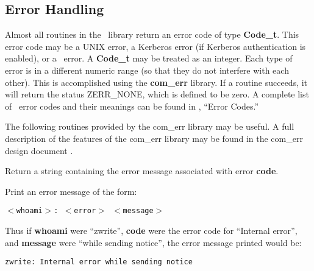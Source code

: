 %
\subsection{Error Handling}
\label{error-handling}

Almost all routines in the \Zephyr\ library return an error
code of type {\bf Code_t}.  This error code may be a UNIX
error, a Kerberos error (if Kerberos authentication is enabled), or a
\Zephyr\ error.  A {\bf Code_t} may be treated as an integer.  Each
type of error is in a different numeric range (so that
they do not interfere with each other).  This is accomplished using the
{\bf com_err} library.  If a routine succeeds, it will return the
status ZERR_NONE, which is defined to be zero.  A complete list of
\Zephyr\ error codes and their meanings can be found in
, ``Error Codes.''

The following routines provided by the com_err library may be useful.
A full description of the features of the com_err library may be
found in the com_err design document \cite{comerr-paper}.

\nwetemplate

Return a string containing the error message associated with error
{\bf code}.

\nwetemplate

Print an error message of the form:

{\tt $<$whoami$>$:\ $<$error$>$ $<$message$>$}

\noindent Thus if {\bf whoami} were ``zwrite'', {\bf code} were the
error code for ``Internal error'', and {\bf message} were ``while sending
notice'', the error message printed would be:

{\tt zwrite:\ Internal error while sending notice}

